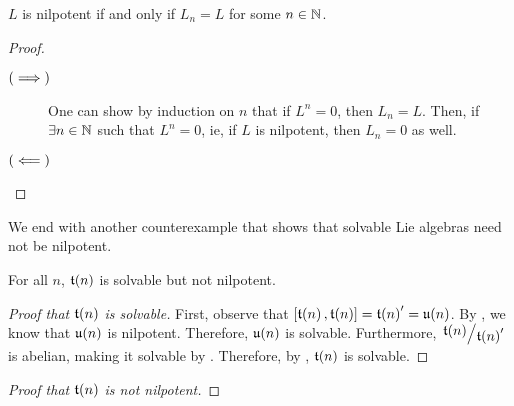 \begin{boxproposition}
    $L$ is nilpotent if and only if $L_n = L$ for some $n \in \mathbb{N}$.
\end{boxproposition}
\begin{proof} \hfill
    \begin{description}
        \item[$\left( \implies \right)$]
            One can show by induction on $n$ that if $L^n = 0$, then $L_n = L$. Then, if $\exists n \in \mathbb{N}$ such that $L^n = 0$, ie, if $L$ is nilpotent, then $L_n = 0$ as well.  \sorry %

        \item[$\left( \impliedby \right)$] 
            \sorry
    \end{description}
\end{proof}

We end with another counterexample that shows that solvable Lie algebras need not be nilpotent.

\begin{boxcexample}
    For all $n$, $\mathfrak{t}\!\left( n \right)$ is solvable but not nilpotent.
    \begin{proof}[Proof that $\mathfrak{t}\!\left( n \right)$ is solvable]
        First, observe that $\left[ \mathfrak{t}\!\left( n \right), \mathfrak{t}\!\left( n \right) \right] = \mathfrak{t}\!\left( n \right)' = \mathfrak{u}\!\left( n \right)$. By \sorry, we know that $\mathfrak{u}\!\left( n \right)$ is nilpotent. Therefore, $\mathfrak{u}\!\left( n \right)$ is solvable. Furthermore, $\quotient{\t{n}}{\t{n}'}$ is abelian, making it solvable by \sorry. Therefore, by , $\mathfrak{t}\!\left( n \right)$ is solvable.
    \end{proof}

    \begin{proof}[Proof that $\mathfrak{t}\!\left( n \right)$ is not nilpotent]
        
    \end{proof}
\end{boxcexample}
